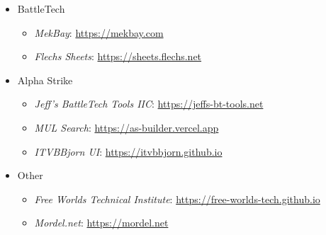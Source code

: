 \begin{itemize}

  \item BattleTech

  \begin{itemize}

    \item \emph{MekBay}: \href{https://mekbay.com}{https://mekbay.com}

    \item \emph{Flechs Sheets}: \href{https://sheets.flechs.net}{https://sheets.flechs.net}

  \end{itemize}

  \item Alpha Strike

  \begin{itemize}

    \item \emph{Jeff's BattleTech Tools IIC}: \href{https://jeffs-bt-tools.net}{https://jeffs-bt-tools.net}

    \item \emph{MUL Search}: \href{https://as-builder.vercel.app}{https://as-builder.vercel.app}

    \item \emph{ITVBBjorn UI}: \href{https://itvbbjorn.github.io}{https://itvbbjorn.github.io}

  \end{itemize}

  \item Other

  \begin{itemize}

    \item \emph{Free Worlds Technical Institute}: \href{https://free-worlds-tech.github.io}{https://free-worlds-tech.github.io}

    \item \emph{Mordel.net}: \href{https://mordel.net}{https://mordel.net}

  \end{itemize}

\end{itemize}
